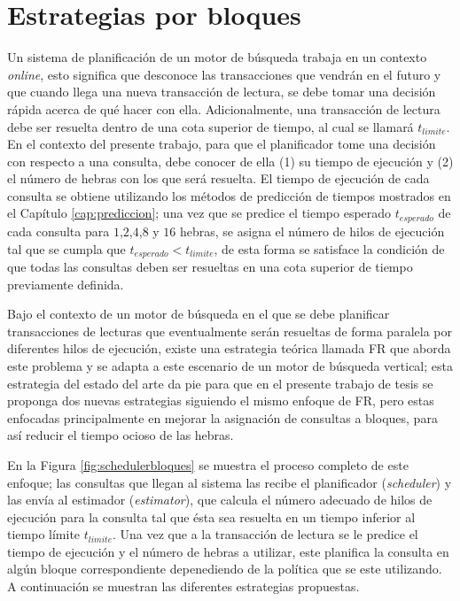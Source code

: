 \section{Estrategias por bloques}
\label{scheduling:bloques}
Un sistema de planificación de un motor de búsqueda trabaja en un contexto \textit{online}, esto significa que desconoce las transacciones que vendrán en el futuro y que cuando llega una nueva transacción de lectura, se debe tomar una decisión rápida acerca de qué hacer con ella. Adicionalmente, una transacción de lectura debe ser resuelta dentro de una cota superior de tiempo, al cual se llamará $t_{limite}$. En el contexto del presente trabajo, para que el planificador tome una decisión con respecto a una consulta, debe conocer de ella (1) su tiempo de ejecución y (2) el número de hebras con los que será resuelta. El tiempo de ejecución de cada consulta se obtiene utilizando los métodos de predicción de tiempos mostrados en el Capítulo \ref{cap:prediccion}; una vez que se predice el tiempo esperado $t_{esperado}$ de cada consulta para $1$,$2$,$4$,$8$ y $16$ hebras, se asigna el número de hilos de ejecución tal que se cumpla que $t_{esperado} < t_{limite}$, de esta forma se satisface la condición de que todas las consultas deben ser resueltas en una cota superior de tiempo previamente definida.

Bajo el contexto de un motor de búsqueda en el que se debe planificar transacciones de lecturas que eventualmente serán resueltas de forma paralela por diferentes hilos de ejecución, existe una estrategia teórica llamada FR que aborda este problema \citep{Ye:2007} y se adapta a este escenario de un motor de búsqueda vertical; esta estrategia del estado del arte da pie para que en el presente trabajo de tesis se proponga dos nuevas estrategias siguiendo el mismo enfoque de FR, pero estas enfocadas principalmente en mejorar la asignación de consultas a bloques, para así reducir el tiempo ocioso de las hebras. 

En la Figura \ref{fig:schedulerbloques} se muestra el proceso completo de este enfoque; las consultas que llegan al sistema las recibe el planificador (\textit{scheduler}) y las envía al estimador (\textit{estimator}), que calcula el número adecuado de hilos de ejecución para la consulta tal que ésta sea resuelta en un tiempo inferior al tiempo límite $t_{limite}$. Una vez que a la transacción de lectura se le predice el tiempo de ejecución y el número de hebras a utilizar, este planifica la consulta en algún bloque correspondiente depenediendo de la política que se este utilizando. A continuación se muestran las diferentes estrategias propuestas. 

